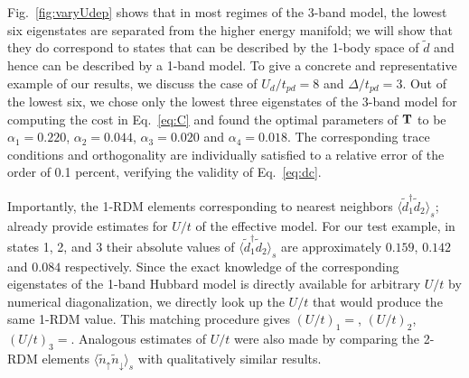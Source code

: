 Fig.~\ref{fig:varyUdep} shows that in most regimes of the 3-band model, the lowest six eigenstates 
are separated from the higher energy manifold; we will show that they do 
correspond to states that can be described by the 1-body space of $\tilde{d}$ and hence can be described by a 1-band model. 
To give a concrete and representative example of our results, we discuss the case of 
$U_d/t_{pd}=8$ and $\Delta/t_{pd}=3$. Out of the lowest six, we chose only the lowest three eigenstates 
of the 3-band model for computing the cost in Eq.~\ref{eq:C} and found the optimal parameters of 
${\bf T}$ to be $\alpha_1=0.220$, $\alpha_2=0.044$, $\alpha_3=0.020$ and $\alpha_4=0.018$. 
The corresponding trace conditions and orthogonality are individually 
satisfied to a relative error of the order of 0.1 percent, verifying 
the validity of Eq.~\ref{eq:dc}.

Importantly, the 1-RDM elements corresponding to nearest neighbors $\langle \tilde{d}_1^{\dagger} \tilde{d}_2 \rangle_s$; 
already provide estimates for $U/t$ of the effective model. 
For our test example, in states 1, 2, and 3 their absolute values of $\langle \tilde{d}_1^{\dagger} \tilde{d}_2 \rangle_s$ 
are approximately $0.159$, $0.142$ and $0.084$ respectively. Since the exact knowledge of the 
corresponding eigenstates of the 1-band Hubbard model is directly available for arbitrary 
$U/t$ by numerical diagonalization, we directly look up the $U/t$ that would produce the same 1-RDM value.
This matching procedure gives $(U/t)_1 = $, $(U/t)_2$, $(U/t)_3 = $. Analogous estimates of $U/t$ were 
also made by comparing the 2-RDM elements $\langle \tilde{n}_{\uparrow} \tilde{n}_{\downarrow} \rangle_s$ 
with qualitatively similar results. 

